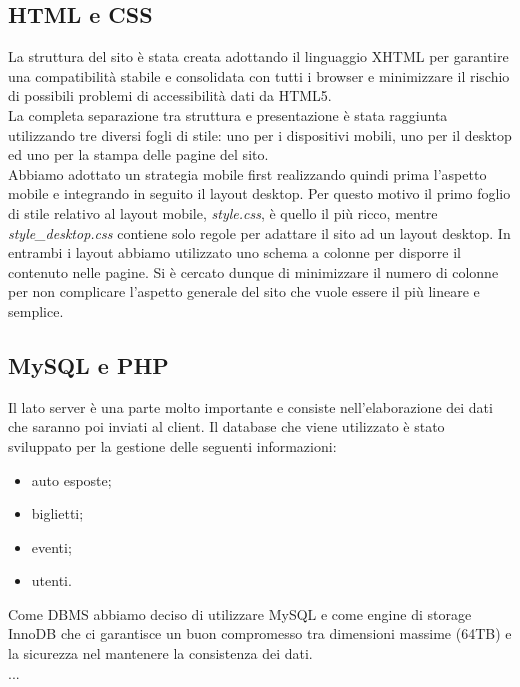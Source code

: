 \subsection{HTML e CSS}
La struttura del sito è stata creata adottando il linguaggio XHTML per garantire una compatibilità stabile e consolidata con tutti i browser e minimizzare il rischio di possibili problemi di accessibilità dati da HTML5.\\
La completa separazione tra struttura e presentazione è stata raggiunta utilizzando tre diversi fogli di stile: uno per i dispositivi mobili, uno per il desktop ed uno per la stampa delle pagine del sito.\\
 Abbiamo adottato un strategia mobile first realizzando quindi prima l'aspetto mobile e integrando in seguito il layout desktop. Per questo motivo il primo foglio di stile relativo al layout mobile, \textit{style.css}, è quello il più ricco, mentre \textit{style\_desktop.css} contiene solo regole per adattare il sito ad un layout desktop. In entrambi i layout abbiamo utilizzato uno schema a colonne per disporre il contenuto nelle pagine. Si è cercato dunque di minimizzare il numero di colonne per non complicare l'aspetto generale del sito che vuole essere il più lineare e semplice.

\subsection{MySQL e PHP}
Il lato server è una parte molto importante e consiste nell'elaborazione dei dati che saranno poi inviati al client. Il database che viene utilizzato è stato sviluppato per la gestione delle seguenti informazioni:
\begin{itemize}
	\item auto esposte;
	\item biglietti;
	\item eventi;
	\item utenti.
\end{itemize}
Come DBMS abbiamo deciso di utilizzare MySQL e come engine di storage InnoDB che ci garantisce un buon compromesso	tra dimensioni massime (64TB) e la sicurezza nel mantenere la consistenza dei dati.\\
...


